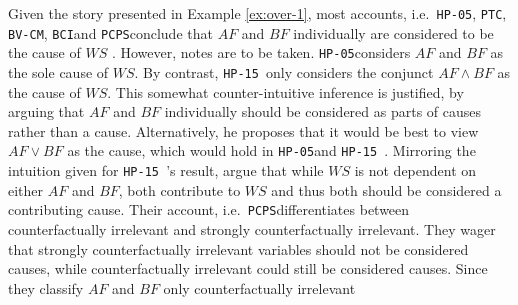 \documentclass[11pt,a4paper]{book}
\theoremstyle{definition}
\theoremstyle{definition}
\theoremstyle{definition}
\theoremstyle{remark}
\newcommand{\hpu}{\texttt{HP-05}}
\newcommand{\ptc}{\texttt{PTC}}
\newcommand{\hpm}{\texttt{HP-15 }}
\newcommand{\bvcm}{\texttt{BV-CM}}
\newcommand{\bci}{\texttt{BCI}}
\newcommand{\pcps}{\texttt{PCPS}}
\newcommand{\sccf}{\texttt{SC-CF}}
\begin{document}
Given the story presented in Example \ref{ex:over-1}, most accounts, i.e.\ \hpu, \ptc, \bvcm, \bci and \pcps  conclude that $AF$ and $BF$ individually are considered to be the cause of $WS$ \parencite{beckers2018principled,bochman2018actual,denecker2018causal,weslake2015partial,halpern2016actual}.
However, notes are to be taken. \hpu considers $AF$ and $BF$ as the sole cause of $WS$. 
By contrast, \hpm only considers the conjunct $AF \land BF$ as the cause of $WS$. This somewhat counter-intuitive inference is justified, by arguing that $AF$ and $BF$ individually should be considered as parts of causes rather than a cause. Alternatively, he proposes that it would be best to view $AF \lor BF$ as the cause, which would hold in \hpu and \hpm \parencite[p.~29]{halpern2016actual}.
Mirroring the intuition given for \hpm's result, \parencite{beckers2018principled} argue that while $WS$ is not dependent on either $AF$ and $BF$, both contribute to $WS$ and thus both should be considered a contributing cause. 
Their account, i.e.\ \pcps differentiates between counterfactually irrelevant and strongly counterfactually irrelevant. They wager that strongly counterfactually irrelevant variables should not be considered causes, while counterfactually irrelevant could still be considered causes. Since they classify $AF$ and $BF$ only counterfactually irrelevant 














\end{document}
